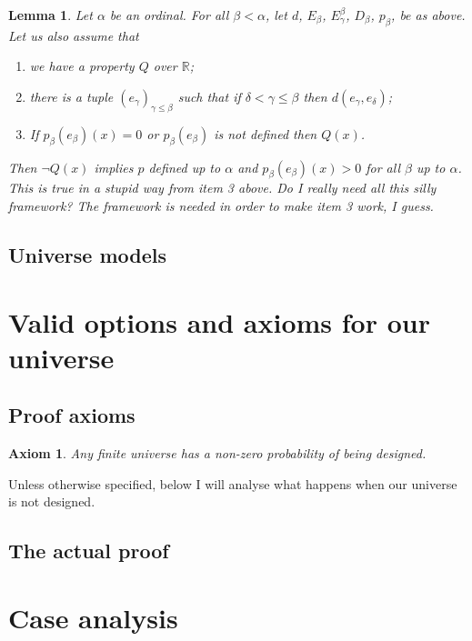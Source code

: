\documentclass[a4paper
,draft
]{article}
\def\reale{\mathbb{R}}
\newtheorem{lemma}{Lemma}
\newtheorem{axiom}{Axiom}
\begin{document}
\begin{lemma}
  Let $\alpha$ be an ordinal. For all $\beta < \alpha$, let $d$,
  $E_\beta$, $E^\beta_\gamma$, $D_\beta$,
  $p_\beta$, be as above. Let us also assume that
  \begin{enumerate}
    \item we have a property $Q$ over $\reale$;
    \item there is a tuple $(e_\gamma)_{\gamma \le \beta}$ such that if
          $\delta < \gamma \le \beta$ then $d(e_\gamma, e_\delta)$;
    \item If $p_\beta(e_\beta)(x) = 0$ or $p_\beta(e_\beta)$ is not defined
          then $Q(x)$.
  \end{enumerate}

  Then $\neg Q(x)$ implies $p$ defined up to $\alpha$ and
  $p_\beta(e_\beta)(x) > 0$ for all $\beta$ up to $\alpha$.
\proof
  This is true in a stupid way from item 3 above. Do I really need all this
  silly framework? The framework is needed in order to make item 3 work,
  I guess.
\end{lemma}


\subsection{Universe models}


\section{Valid options and axioms for our universe}


\subsection{Proof axioms}

\begin{axiom}
Any finite universe has a non-zero probability of being designed.
\end{axiom}

Unless otherwise specified, below I will analyse what happens when our
universe is not designed.

\subsection {The actual proof}

\section{Case analysis}
\end{document}
